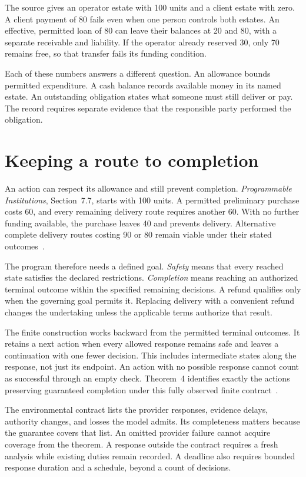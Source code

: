 \documentclass{momentum}
\begin{document}
The source gives an operator estate with 100 units and a client estate with zero.
A client payment of 80 fails even when one person controls both estates.
An effective, permitted loan of 80 can leave their balances at 20 and 80, with a separate receivable and liability.
If the operator already reserved 30, only 70 remains free, so that transfer fails its funding condition.

Each of these numbers answers a different question.
An allowance bounds permitted expenditure.
A cash balance records available money in its named estate.
An outstanding obligation states what someone must still deliver or pay.
The record requires separate evidence that the responsible party performed the obligation.

\section{Keeping a route to completion}
\label{sec:completion}

An action can respect its allowance and still prevent completion.
\emph{Programmable Institutions}, Section~7.7, starts with 100 units.
A permitted preliminary purchase costs 60, and every remaining delivery route requires another 60.
With no further funding available, the purchase leaves 40 and prevents delivery.
Alternative complete delivery routes costing 90 or 80 remain viable under their stated outcomes~\cite[Section~7.7]{institutions}.

The program therefore needs a defined goal.
\emph{Safety} means that every reached state satisfies the declared restrictions.
\emph{Completion} means reaching an authorized terminal outcome within the specified remaining decisions.
A refund qualifies only when the governing goal permits it.
Replacing delivery with a convenient refund changes the undertaking unless the applicable terms authorize that result.

The finite construction works backward from the permitted terminal outcomes.
It retains a next action when every allowed response remains safe and leaves a continuation with one fewer decision.
This includes intermediate states along the response, not just its endpoint.
An action with no possible response cannot count as successful through an empty check.
Theorem~4 identifies exactly the actions preserving guaranteed completion under this fully observed finite contract~\cite[Section~7.7]{institutions}.

The environmental contract lists the provider responses, evidence delays, authority changes, and losses the model admits.
Its completeness matters because the guarantee covers that list.
An omitted provider failure cannot acquire coverage from the theorem.
A response outside the contract requires a fresh analysis while existing duties remain recorded.
A deadline also requires bounded response duration and a schedule, beyond a count of decisions.
\end{document}
